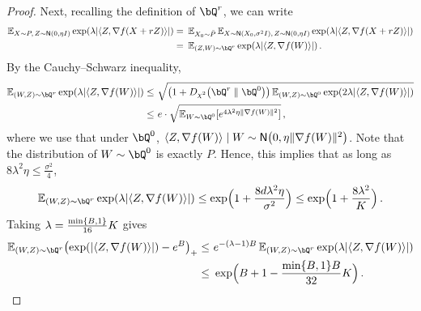 \begin{proof}
Next, recalling the definition of $\bQr$, we can write
\begin{align*}
\En_{X\sim P,\, Z\sim \normal{0,\eta\Id}} \exp\prn*{ \lambda\abs*{\tri{Z, \nabla f(X+r Z)}} } 
    =&~ \En_{X_0\sim \bar P} \En_{X\sim \normal{X_0,\sigma^2\Id},\, Z\sim \normal{0,\eta\Id}} \exp\prn*{ \lambda\abs*{\tri{Z, \nabla f(X+r Z)}} } \\
    =&~ \En_{(Z,W)\sim \bQr} \exp\prn*{ \lambda\abs*{\tri{Z, \nabla f(W)}}}\,.
\end{align*}
By the Cauchy--Schwarz inequality,
\begin{align*}
    \En_{(W,Z)\sim \bQr} \exp\prn*{ \lambda\abs*{\tri{Z, \nabla f(W)}} }
    \leq&~ \sqrt{\prn*{1+\Dchis{\bQr}{\bQr[0]}}\En_{(W,Z)\sim \bQr[0]} \exp\prn*{ 2\lambda\abs*{\tri{Z, \nabla f(W)}} } } \\
    \leq&~ e\cdot \sqrt{\En_{W\sim \bQr[0]}[e^{4\lambda^2\eta\nrm{\nabla f(W)}^2}]}\,,
\end{align*}
where we use that under $\bQr[0]$, $\tri{Z, \nabla f(W)}\mid W\sim \normal{0,\eta\nrm{\nabla f(W)}^2}$. Note that the distribution of $W\sim \bQr[0]$ is exactly $P$. Hence, this implies that as long as $8\lambda^2\eta\leq \frac{\sigma^2}{4}$,
\begin{align*}
    \En_{(W,Z)\sim \bQr} \exp\prn*{ \lambda\abs*{\tri{Z, \nabla f(W)}} } \leq \exp\prn[\Big]{1+\frac{8d\lambda^2\eta}{\sigma^2}}\leq \exp\prn[\Big]{1+\frac{8\lambda^2}{K}}\,. 
\end{align*}
Taking $\lambda=\frac{\min\{B,1\}}{16}K$ gives
\begin{align*}
    \En_{(W,Z)\sim \bQr} \prn*{ \exp\prn*{ \abs*{\tri{Z, \nabla f(W)}}} - e^\B}_+
    \leq&~ e^{-(\lambda-1)B}\En_{(W,Z)\sim \bQr} \exp\prn*{ \lambda \abs*{\tri{Z, \nabla f(W)}}}  \\
    \leq&~ \exp\prn[\Big]{\B+1-\frac{\min\crl{\B,1}\B}{32}K}\,.
\end{align*}






\end{proof}


